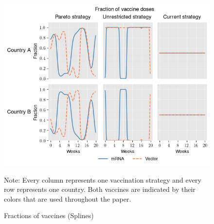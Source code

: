 \begin{figure}[h!]
\centering
\includegraphics[scale=0.85]{images/splines_vaccine_fractions.png}\\
\begin{flushleft}
\scriptsize{Note:} Every column represents one vaccination strategy and every row represents one country. Both vaccines are indicated by their colors that are used throughout the paper. 
\end{flushleft}
\caption{Fractions of vaccines (Splines)}
\label{fig:results_splines_allocation_fractions}
\end{figure}

\clearpage
